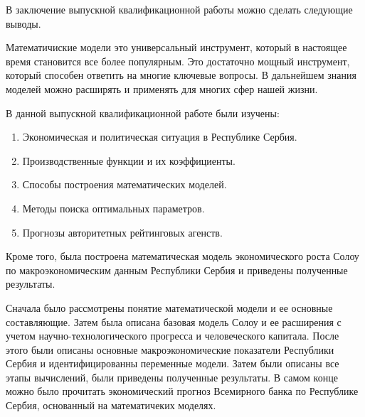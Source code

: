 \Conclusion

В заключение выпускной квалификационной работы можно сделать следующие выводы.

Математичиские модели это универсальный инструмент, который в настоящее время становится все более популярным.
Это достаточно мощный инструмент, который способен ответить на многие ключевые вопросы.
В дальнейшем знания моделей можно расширять и применять для многих сфер нашей жизни.


В данной выпускной квалификационной работе были изучены:
\begin{enumerate}
	\item Экономическая и политическая ситуация в Республике Сербия.
	\item Производственные функции и их коэффициенты.
	\item Способы построения математических моделей.
	\item Методы поиска оптимальных параметров.
	\item Прогнозы авторитетных рейтинговых агенств.
\end{enumerate}

Кроме того, была построена математическая модель экономического роста Солоу по макроэкономическим данным Республики Сербия и приведены полученные результаты.

Сначала было рассмотрены понятие математической модели и ее основные составляющие.
Затем была описана базовая модель Солоу и ее расширения с учетом научно-технологического прогресса и человеческого капитала.
После этого были описаны основные макроэкономические показатели Республики Сербия и идентифицированны переменные модели.
Затем были описаны все этапы вычислений, были приведены полученные результаты.
В самом конце можно было прочитать экономический прогноз Всемирного банка по Республике Сербия, основанный на математичеких моделях.
